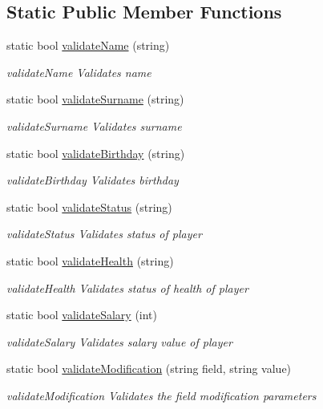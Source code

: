 \subsection*{Static Public Member Functions}
\begin{DoxyCompactItemize}
\item 
static bool \hyperlink{class_player_abb1456b5bc804f27f80506ab3eced9cc}{validate\-Name} (string)
\begin{DoxyCompactList}\small\item\em validate\-Name Validates name \end{DoxyCompactList}\item 
static bool \hyperlink{class_player_a24d1dcb787aed938a56c2576f0dc8d54}{validate\-Surname} (string)
\begin{DoxyCompactList}\small\item\em validate\-Surname Validates surname \end{DoxyCompactList}\item 
static bool \hyperlink{class_player_aaf2f62f9d3d1f2bece5258ae6c8dd1c6}{validate\-Birthday} (string)
\begin{DoxyCompactList}\small\item\em validate\-Birthday Validates birthday \end{DoxyCompactList}\item 
static bool \hyperlink{class_player_af26b9a23c75cee78b8e06a516a4d0720}{validate\-Status} (string)
\begin{DoxyCompactList}\small\item\em validate\-Status Validates status of player \end{DoxyCompactList}\item 
static bool \hyperlink{class_player_a04be7b253085529222ed5616772319f5}{validate\-Health} (string)
\begin{DoxyCompactList}\small\item\em validate\-Health Validates status of health of player \end{DoxyCompactList}\item 
static bool \hyperlink{class_player_aa3bd122182accc2ca31eb7e01ec0cd7c}{validate\-Salary} (int)
\begin{DoxyCompactList}\small\item\em validate\-Salary Validates salary value of player \end{DoxyCompactList}\item 
static bool \hyperlink{class_player_ae71449232dae50d1eb03ea40a6e0d5c3}{validate\-Modification} (string field, string value)
\begin{DoxyCompactList}\small\item\em validate\-Modification Validates the field modification parameters \end{DoxyCompactList}\end{DoxyCompactItemize}
